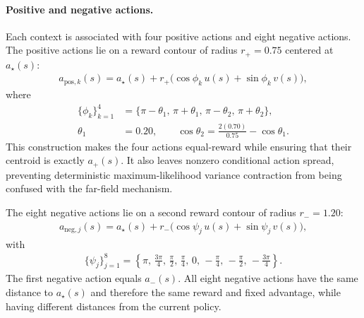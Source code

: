 \paragraph{Positive and negative actions.}
Each context is associated with four positive actions and eight negative
actions. The positive actions lie on a reward contour of radius
$r_+=0.75$
centered at $a_\star(s)$:
\begin{equation}
\begin{aligned}
    a_{\mathrm{pos},k}(s)
    =
    a_\star(s)
    +
    r_+
    \bigl(
        \cos\phi_k\,u(s)
        +
        \sin\phi_k\,v(s)
    \bigr),
\end{aligned}
\label{eq:cu1_positive_actions}
\end{equation}
where
\begin{equation}
\begin{aligned}
    \{\phi_k\}_{k=1}^{4}
    &=
    \{
        \pi-\theta_1,\,
        \pi+\theta_1,\,
        \pi-\theta_2,\,
        \pi+\theta_2
    \}, \\
    \theta_1
    &=
    0.20,
    \qquad
    \cos\theta_2
    =
    \frac{2(0.70)}{0.75}
    -
    \cos\theta_1.
\end{aligned}
\label{eq:cu1_positive_angles}
\end{equation}
This construction makes the four actions equal-reward while ensuring
that their centroid is exactly $a_+(s)$. It also leaves nonzero
conditional action spread, preventing deterministic maximum-likelihood
variance contraction from being confused with the far-field mechanism.

The eight negative actions lie on a second reward contour of radius
$r_-=1.20$:
\begin{equation}
\begin{aligned}
    a_{\mathrm{neg},j}(s)
    =
    a_\star(s)
    +
    r_-
    \bigl(
        \cos\psi_j\,u(s)
        +
        \sin\psi_j\,v(s)
    \bigr),
\end{aligned}
\label{eq:cu1_negative_actions}
\end{equation}
with
\begin{equation}
\begin{aligned}
    \{\psi_j\}_{j=1}^{8}
    =
    \left\{
        \pi,\,
        \frac{3\pi}{4},\,
        \frac{\pi}{2},\,
        \frac{\pi}{4},\,
        0,\,
        -\frac{\pi}{4},\,
        -\frac{\pi}{2},\,
        -\frac{3\pi}{4}
    \right\}.
\end{aligned}
\label{eq:cu1_negative_angles}
\end{equation}
The first negative action equals $a_-(s)$. All eight negative actions
have the same distance to $a_\star(s)$ and therefore the same reward and
fixed advantage, while having different distances from the current
policy.

